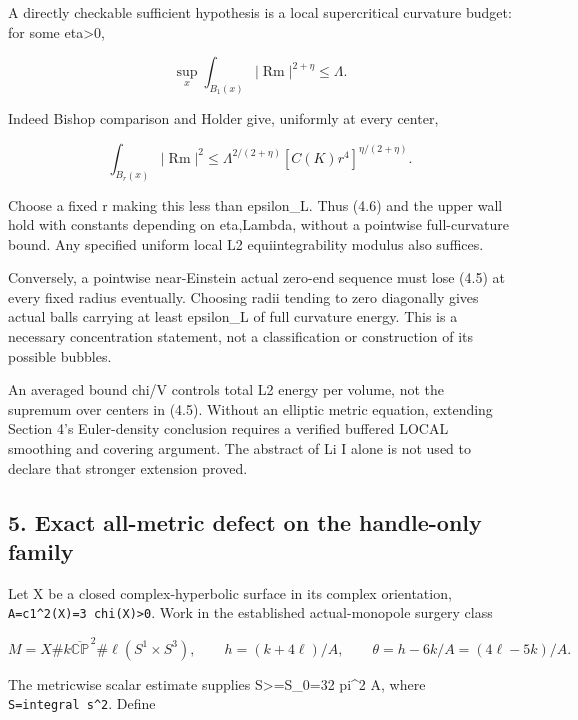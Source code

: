 \documentclass[
  10pt,
]{article}
\begin{document}
A directly checkable sufficient hypothesis is a local supercritical
curvature budget: for some eta\textgreater0,

\[
                \sup_x\int_{B_1(x)}|\operatorname{Rm}|^{2+\eta}
                           \le\Lambda.               \tag{4.7}
\]

Indeed Bishop comparison and Holder give, uniformly at every center,

\[
 \int_{B_r(x)}|\operatorname{Rm}|^2
 \le\Lambda^{2/(2+\eta)}
                [C(K)r^4]^{\eta/(2+\eta)}.           \tag{4.8}
\]

Choose a fixed r making this less than epsilon\_L. Thus (4.6) and the
upper wall hold with constants depending on eta,Lambda, without a
pointwise full-curvature bound. Any specified uniform local L2
equiintegrability modulus also suffices.

Conversely, a pointwise near-Einstein actual zero-end sequence must lose
(4.5) at every fixed radius eventually. Choosing radii tending to zero
diagonally gives actual balls carrying at least epsilon\_L of full
curvature energy. This is a necessary concentration statement, not a
classification or construction of its possible bubbles.

An averaged bound chi/V controls total L2 energy per volume, not the
supremum over centers in (4.5). Without an elliptic metric equation,
extending Section 4's Euler-density conclusion requires a verified
buffered LOCAL smoothing and covering argument. The abstract of Li I
alone is not used to declare that stronger extension proved.

\hypertarget{exact-all-metric-defect-on-the-handle-only-family}{%
\subsection{5. Exact all-metric defect on the handle-only
family}\label{exact-all-metric-defect-on-the-handle-only-family}}

Let X be a closed complex-hyperbolic surface in its complex orientation,
\texttt{A=c1\^{}2(X)=3\ chi(X)\textgreater{}0}. Work in the established
actual-monopole surgery class

\[
 M=X\#k\overline{\mathbb {CP}}^{\,2}
           \#\ell(S^1\times S^3),\qquad
 h=(k+4\ell)/A,\qquad
 \theta=h-6k/A=(4\ell-5k)/A.                       \tag{5.1}
\]

The metricwise scalar estimate supplies S\textgreater=S\_0=32 pi\^{}2 A,
where \texttt{S=integral\ s\^{}2}. Define
\end{document}
